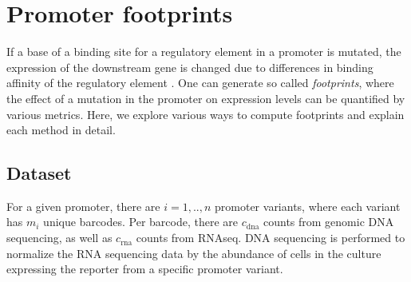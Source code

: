 \section{Promoter footprints}
If a base of a binding site for a regulatory element in a promoter is mutated, the expression of the downstream gene is changed due to differences in binding affinity of the regulatory element . One can generate so called \textit{footprints}, where the effect of a mutation in the promoter on expression levels can be quantified by various metrics. Here, we explore various ways to compute footprints and explain each method in detail.
\subsection{Dataset}
For a given promoter, there are $i = 1,..,n$ promoter variants, where each variant has $m_i$ unique barcodes. Per barcode, there are $c_{\mathrm{dna}}$ counts from genomic DNA sequencing, as well as $c_{\mathrm{rna}}$ counts from RNAseq. DNA sequencing is performed to normalize the RNA sequencing data by the abundance of cells in the culture expressing the reporter from a specific promoter variant.
